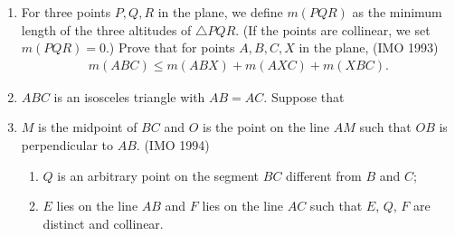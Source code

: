 \begin{enumerate}[label=\thesubsection.\arabic*,ref=\thesubsection.\theenumi]
\item For three points $P, Q, R$ in the plane, we define $m(PQR)$ as the minimum length of the three altitudes of $\triangle PQR$. (If the points are collinear, we set $m(PQR) = 0$.)                                                                           
  Prove that for points $A, B, C, X$ in the plane,
 \hfill(IMO  1993)
\begin{align*}
                                                     m(ABC) \leq m(ABX) + m(AXC) + m(XBC).
\end{align*}
\item $ABC$ is an isosceles triangle with $AB = AC$. Suppose that  
\item  $M$ is the midpoint of $BC$ and $O$ is the point on the line $AM$ such that $OB$ is perpendicular to $AB$.
\hfill(IMO  1994)
\begin{enumerate}
\item $Q$ is an arbitrary point on the segment $BC$ different from $B$ and $C$;                           
\item $E$ lies on the line $AB$ and $F$ lies on the line $AC$ such that $E$, $Q$, $F$ are distinct and collinear.
 

\end{enumerate}
\end{enumerate}
